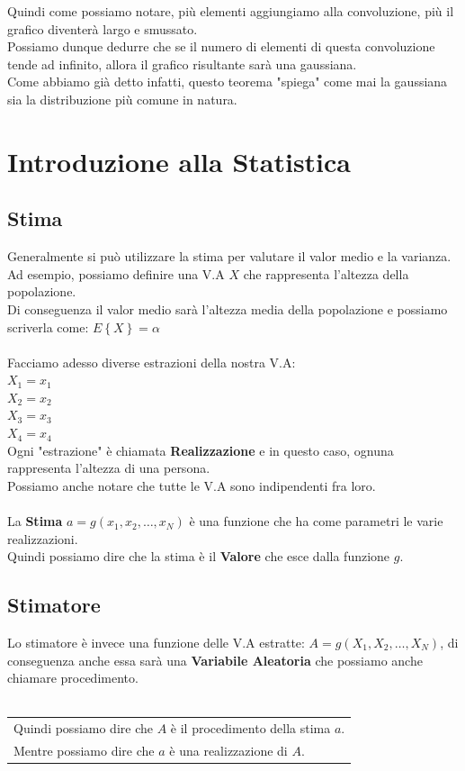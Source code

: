 \documentclass{article}
\begin{document}
Quindi come possiamo notare, più elementi aggiungiamo alla convoluzione, più il grafico diventerà largo e smussato. \\
Possiamo dunque dedurre che se il numero di elementi di questa convoluzione tende ad infinito, allora il grafico risultante sarà una gaussiana. \\
Come abbiamo già detto infatti, questo teorema "spiega" come mai la gaussiana sia la distribuzione più comune in natura.

\section{Introduzione alla Statistica}
\subsection{Stima}
Generalmente si può utilizzare la stima per valutare il valor medio e la varianza. \\
Ad esempio, possiamo definire una V.A $X$ che rappresenta l'altezza della popolazione. \\
Di conseguenza il valor medio sarà l'altezza media della popolazione e possiamo scriverla come: $E\left\{ X \right\} = \alpha$ \\ \\
Facciamo adesso diverse estrazioni della nostra V.A: \\
$X_1 = x_1$ \\
$X_2 = x_2$ \\
$X_3 = x_3$ \\
$X_4 = x_4$ \\
Ogni "estrazione" è chiamata \textbf{Realizzazione} e in questo caso, ognuna rappresenta l'altezza di una persona. \\
Possiamo anche notare che tutte le V.A sono indipendenti fra loro. \\ \\
La \textbf{Stima} $a = g(x_1, x_2, \dots, x_N)$ è una funzione che ha come parametri le varie realizzazioni. \\
Quindi possiamo dire che la stima è il \textbf{Valore} che esce dalla funzione $g$.
\subsection{Stimatore}
Lo stimatore è invece una funzione delle V.A estratte: $A = g(X_1, X_2, \dots, X_N)$, di conseguenza anche essa sarà una \textbf{Variabile Aleatoria} che possiamo anche chiamare procedimento. \\ \\
\begin{tabular}{|p{13cm}}
Quindi possiamo dire che $A$ è il procedimento della stima $a$. \\
Mentre possiamo dire che $a$ è una realizzazione di $A$.
\end{tabular} \\
\end{document}
